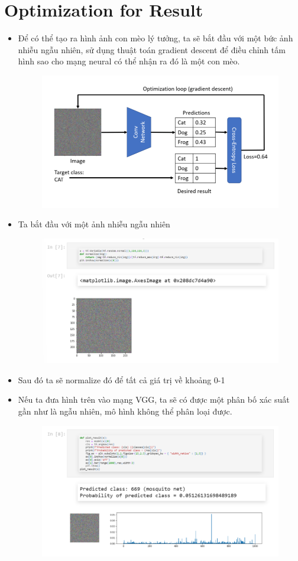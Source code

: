\documentclass{book}
\begin{document}
\section{Optimization for Result}
\begin{itemize}
	\item Để có thể tạo ra hình ảnh con mèo lý tưởng, ta sẽ bắt đầu với một bức ảnh nhiễu ngẫu nhiên, sử dụng thuật toán gradient descent để điều chỉnh tấm hình sao cho mạng neural có thể nhận ra đó là một con mèo.
	\begin{figure}[H]
		\centering
		\includegraphics[width=0.75\linewidth]{images/ad1_opti.png}
	\end{figure}
	\item Ta bắt đầu với một ảnh nhiễu ngẫu nhiên
	\begin{figure}[H]
		\centering
		\includegraphics[width=0.75\linewidth]{images/ad2_noisecode.png}
	\end{figure}
	\item Sau đó ta sẽ normalize đó để tất cả giá trị về khoảng 0-1
	\item Nếu ta đưa hình trên vào mạng VGG, ta sẽ có được một phân bố xác suất gần như là ngẫu nhiên, mô hình không thể phân loại được.
	\begin{figure}[H]
		\centering
		\includegraphics[width=0.75\linewidth]{images/ad3_noisevgg.png}

\end{figure}
\end{itemize}
\end{document}
